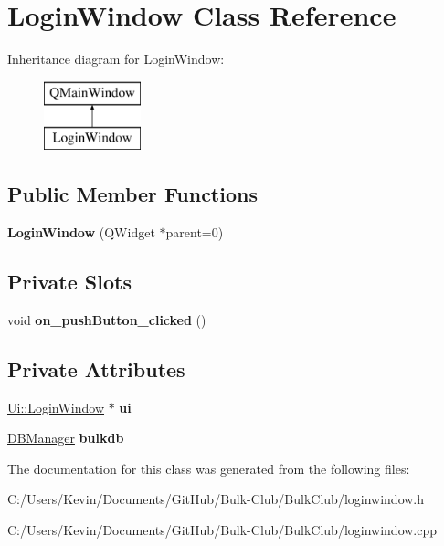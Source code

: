 \hypertarget{class_login_window}{}\section{Login\+Window Class Reference}
\label{class_login_window}
Inheritance diagram for Login\+Window\+:\begin{figure}[H]
\begin{center}
\leavevmode
\includegraphics[height=2.000000cm]{class_login_window}
\end{center}
\end{figure}
\subsection*{Public Member Functions}
\begin{DoxyCompactItemize}
\item 
\mbox{\label{class_login_window_aacfb01de174b9eaf5a712bbfd4b6d9b5}} 
{\bfseries Login\+Window} (Q\+Widget $\ast$parent=0)
\end{DoxyCompactItemize}
\subsection*{Private Slots}
\begin{DoxyCompactItemize}
\item 
\mbox{\label{class_login_window_a446c7e979ad43939a935cffe02163305}} 
void {\bfseries on\+\_\+push\+Button\+\_\+clicked} ()
\end{DoxyCompactItemize}
\subsection*{Private Attributes}
\begin{DoxyCompactItemize}
\item 
\mbox{\label{class_login_window_a583f5c7dda98acd3e65791101f9ff2a0}} 
\mbox{\hyperlink{class_ui_1_1_login_window}{Ui\+::\+Login\+Window}} $\ast$ {\bfseries ui}
\item 
\mbox{\label{class_login_window_a88c35ae92215a45d63283feb09b0e14c}} 
\mbox{\hyperlink{class_d_b_manager}{D\+B\+Manager}} {\bfseries bulkdb}
\end{DoxyCompactItemize}


The documentation for this class was generated from the following files\+:\begin{DoxyCompactItemize}
\item 
C\+:/\+Users/\+Kevin/\+Documents/\+Git\+Hub/\+Bulk-\/\+Club/\+Bulk\+Club/loginwindow.\+h\item 
C\+:/\+Users/\+Kevin/\+Documents/\+Git\+Hub/\+Bulk-\/\+Club/\+Bulk\+Club/loginwindow.\+cpp\end{DoxyCompactItemize}
